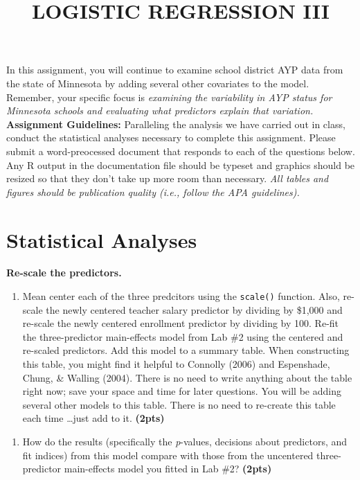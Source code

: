 \documentclass[]{article}
\title{LOGISTIC REGRESSION III}
\author{}
\date{}
\begin{document}
\maketitle 
\thispagestyle{fancy}

\noindent In this assignment, you will continue to examine school district AYP data from the state of Minnesota by adding several other covariates to the model. Remember, your specific focus is \textit{examining the variability in AYP status for Minnesota schools and evaluating what predictors explain that variation.} 
\\
\linebreak
\noindent \textbf{Assignment Guidelines:} Paralleling the analysis we have carried out in class, conduct the statistical analyses necessary to complete this assignment. Please submit a word-preocessed document that responds to each of the questions below. Any R output in the documentation file should be typeset and graphics should be resized so that they don't take up more room than necessary. \textit{All tables and figures should be publication quality (i.e., follow the APA guidelines).}



\section*{Statistical Analyses}

\noindent\textbf{Re-scale the predictors.}

\begin{enumerate}[resume]
\item Mean center each of the three predcitors using the \texttt{scale()} function. Also, re-scale the newly centered teacher salary predictor by dividing by \$1,000 and re-scale the newly centered enrollment predictor by dividing by 100. Re-fit the three-predictor main-effects model from Lab \#2 using the centered and re-scaled predictors. Add this model to a summary table. When constructing this table, you might find it helpful to Connolly (2006) and Espenshade, Chung, \& Walling (2004). There is no need to write anything about the table right now; save your space and time for later questions. You will be adding several other models to this table. There is no need to re-create this table each time \ldots just add to it. \textbf{(2pts)} 
\end{enumerate}

\begin{enumerate}[resume]
\item How do the results (specifically the \textit{p}-values, decisions about predictors, and fit indices) from this model compare with those from the uncentered three-predictor main-effects model you fitted in Lab \#2? \textbf{(2pts)}
\end{enumerate}
\end{document}
